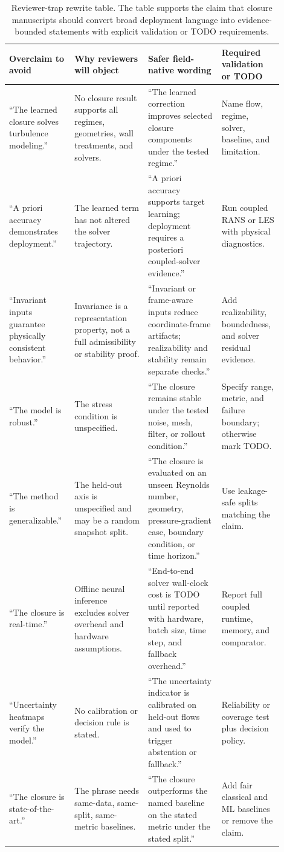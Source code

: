 \documentclass[11pt]{article}
\begin{document}
\begin{table}[t]
\centering
\small
\begin{tabular}{@{}p{0.21\linewidth}p{0.25\linewidth}p{0.25\linewidth}p{0.19\linewidth}@{}}
\toprule
Overclaim to avoid & Why reviewers will object & Safer field-native wording & Required validation or TODO \\
\midrule
``The learned closure solves turbulence modeling.'' &
No closure result supports all regimes, geometries, wall treatments, and solvers. &
``The learned correction improves selected closure components under the tested regime.'' &
Name flow, regime, solver, baseline, and limitation. \\
\addlinespace
``A priori accuracy demonstrates deployment.'' &
The learned term has not altered the solver trajectory. &
``A priori accuracy supports target learning; deployment requires a posteriori coupled-solver evidence.'' &
Run coupled RANS or LES with physical diagnostics. \\
\addlinespace
``Invariant inputs guarantee physically consistent behavior.'' &
Invariance is a representation property, not a full admissibility or stability proof. &
``Invariant or frame-aware inputs reduce coordinate-frame artifacts; realizability and stability remain separate checks.'' &
Add realizability, boundedness, and solver residual evidence. \\
\addlinespace
``The model is robust.'' &
The stress condition is unspecified. &
``The closure remains stable under the tested noise, mesh, filter, or rollout condition.'' &
Specify range, metric, and failure boundary; otherwise mark TODO. \\
\addlinespace
``The method is generalizable.'' &
The held-out axis is unspecified and may be a random snapshot split. &
``The closure is evaluated on an unseen Reynolds number, geometry, pressure-gradient case, boundary condition, or time horizon.'' &
Use leakage-safe splits matching the claim. \\
\addlinespace
``The closure is real-time.'' &
Offline neural inference excludes solver overhead and hardware assumptions. &
``End-to-end solver wall-clock cost is TODO until reported with hardware, batch size, time step, and fallback overhead.'' &
Report full coupled runtime, memory, and comparator. \\
\addlinespace
``Uncertainty heatmaps verify the model.'' &
No calibration or decision rule is stated. &
``The uncertainty indicator is calibrated on held-out flows and used to trigger abstention or fallback.'' &
Reliability or coverage test plus decision policy. \\
\addlinespace
``The closure is state-of-the-art.'' &
The phrase needs same-data, same-split, same-metric baselines. &
``The closure outperforms the named baseline on the stated metric under the stated split.'' &
Add fair classical and ML baselines or remove the claim. \\
\bottomrule
\end{tabular}
\caption{Reviewer-trap rewrite table. The table supports the claim that closure manuscripts should convert broad deployment language into evidence-bounded statements with explicit validation or TODO requirements.}
\label{tab:traps}
\end{table}
\end{document}
